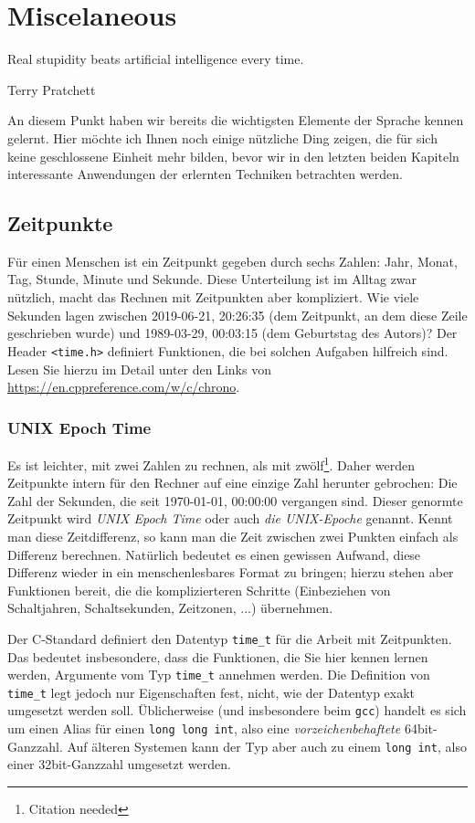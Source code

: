 \chapter{Miscelaneous}
\epigraph{Real stupidity beats artificial intelligence every time.}{Terry Pratchett}

An diesem Punkt haben wir bereits die wichtigsten Elemente der Sprache kennen gelernt. Hier möchte ich Ihnen noch einige nützliche Ding zeigen, die für sich keine geschlossene Einheit mehr bilden, bevor wir in den letzten beiden Kapiteln interessante Anwendungen der erlernten Techniken betrachten werden.

\section{Zeitpunkte}
Für einen Menschen ist ein Zeitpunkt gegeben durch sechs Zahlen: Jahr, Monat, Tag, Stunde, Minute und Sekunde. Diese Unterteilung ist im Alltag zwar nützlich, macht das Rechnen mit Zeitpunkten aber kompliziert. Wie viele Sekunden lagen zwischen 2019-06-21, 20:26:35 (dem Zeitpunkt, an dem diese Zeile geschrieben wurde) und 1989-03-29, 00:03:15 (dem Geburtstag des Autors)? Der Header \texttt{<time.h>} definiert Funktionen, die bei solchen Aufgaben hilfreich sind. Lesen Sie hierzu im Detail unter den Links von \url{https://en.cppreference.com/w/c/chrono}.

\subsection{UNIX Epoch Time}
Es ist leichter, mit zwei Zahlen zu rechnen, als mit zwölf\footnote{Citation needed}. Daher werden Zeitpunkte intern für den Rechner auf eine einzige Zahl herunter gebrochen: Die Zahl der Sekunden, die seit 1970-01-01, 00:00:00 vergangen sind. Dieser genormte Zeitpunkt wird \emph{UNIX Epoch Time} oder auch \emph{die UNIX-Epoche} genannt. Kennt man diese Zeitdifferenz, so kann man die Zeit zwischen zwei Punkten einfach als Differenz berechnen. Natürlich bedeutet es einen gewissen Aufwand, diese Differenz wieder in ein menschenlesbares Format zu bringen; hierzu stehen aber Funktionen bereit, die die komplizierteren Schritte (Einbeziehen von Schaltjahren, Schaltsekunden, Zeitzonen, ...) übernehmen.

Der C-Standard definiert den Datentyp \texttt{time_t} für die Arbeit mit Zeitpunkten. Das bedeutet insbesondere, dass die Funktionen, die Sie hier kennen lernen werden, Argumente vom Typ 
\texttt{time_t} annehmen werden. Die Definition von \texttt{time_t} legt jedoch nur Eigenschaften fest, nicht, wie der Datentyp exakt umgesetzt werden soll. Üblicherweise (und insbesondere beim \texttt{gcc}) handelt es sich um einen Alias für einen \texttt{long long int}, also eine \emph{vorzeichenbehaftete} 64bit-Ganzzahl. Auf älteren Systemen kann der Typ aber auch zu einem \texttt{long int}, also einer 32bit-Ganzzahl umgesetzt werden. 

